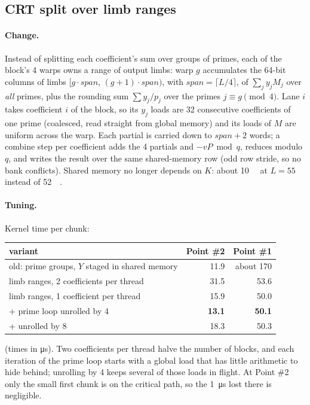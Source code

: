 \documentclass[11pt,a4paper]{article}
\newcommand{\us}[1]{\SI{#1}{\micro\second}}
\begin{document}
\subsection{CRT split over limb ranges}

\paragraph{Change.} Instead of splitting each coefficient's sum over groups of primes,
each of the block's 4 warps owns a range of output limbs: warp $g$ accumulates the 64-bit
columns of limbs $[g\cdot\textit{span},\, (g+1)\cdot\textit{span})$, with
$\textit{span} = \lceil L/4 \rceil$, of $\sum_j y_j M_j$ over \emph{all} primes, plus the
rounding sum $\sum y_j/p_j$ over the primes $j \equiv g \pmod 4$. Lane $i$ takes
coefficient $i$ of the block, so its $y_j$ loads are 32 consecutive coefficients of one
prime (coalesced, read straight from global memory) and its loads of $M$ are uniform
across the warp. Each partial is carried down to $\textit{span}+2$ words; a combine step
per coefficient adds the 4 partials and $-vP \bmod q$, reduces modulo $q$, and writes the
result over the same shared-memory row (odd row stride, so no bank conflicts). Shared
memory no longer depends on $K$: about \SI{10}{\kilo\byte} at $L = 55$ instead of
\SI{52}{\kilo\byte}.

\paragraph{Tuning.} Kernel time per chunk:
\begin{center}
\begin{tabular}{lrr}
\toprule
variant & Point \#2 & Point \#1 \\
\midrule
old: prime groups, $Y$ staged in shared memory & 11.9 & about 170 \\
limb ranges, 2 coefficients per thread & 31.5 & 53.6 \\
limb ranges, 1 coefficient per thread & 15.9 & 50.0 \\
\quad + prime loop unrolled by 4 & \textbf{13.1} & \textbf{50.1} \\
\quad + unrolled by 8 & 18.3 & 50.3 \\
\bottomrule
\end{tabular}
\end{center}
(times in \si{\micro\second}). Two coefficients per thread halve the number of blocks,
and each iteration of the prime loop starts with a global load that has little
arithmetic to hide behind; unrolling by 4 keeps several of those loads in flight. At
Point \#2 only the small first chunk is on the critical path, so the \us{1} lost there is
negligible.
\end{document}
